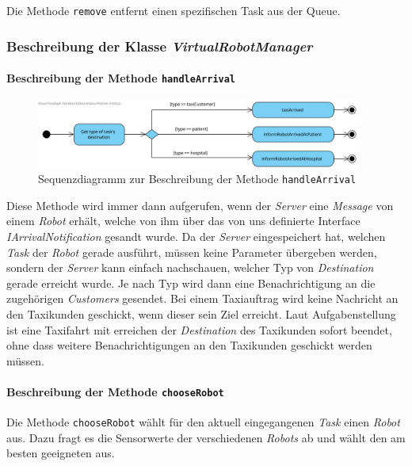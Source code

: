 			Die Methode \texttt{remove} entfernt einen spezifischen Task aus der Queue.
			
	\subsubsection{Beschreibung der Klasse \textit{VirtualRobotManager}}
			\paragraph{Beschreibung der Methode \texttt{handleArrival}}
			\begin{figure}[H]
			\centering
			\includegraphics[width=0.95\textwidth]{img/HandleArrival}
			\caption{Sequenzdiagramm zur Beschreibung der Methode \texttt{handleArrival}}
			\label{SequenzQueuePoll}
			\end{figure}	
			Diese Methode wird immer dann aufgerufen, wenn der \textit{Server} eine \textit{Message} von einem \textit{Robot} erhält, welche von ihm über das von uns definierte Interface \textit{IArrivalNotification} gesandt wurde. Da der \textit{Server} eingespeichert hat, welchen \textit{Task} der \textit{Robot} gerade ausführt, müssen keine Parameter übergeben werden, sondern der \textit{Server} kann einfach nachschauen, welcher Typ von \textit{Destination} gerade erreicht wurde. Je nach Typ wird dann eine Benachrichtigung an die zugehörigen \textit{Customers} gesendet. Bei einem Taxiauftrag wird keine Nachricht an den Taxikunden geschickt, wenn dieser sein Ziel erreicht. Laut Aufgabenstellung ist eine Taxifahrt mit erreichen der \textit{Destination} des Taxikunden sofort beendet, ohne dass weitere Benachrichtigungen an den Taxikunden geschickt werden müssen.
			
			
			\paragraph{Beschreibung der Methode \texttt{chooseRobot}}
			Die Methode \texttt{chooseRobot} wählt für den aktuell eingegangenen \emph{Task} einen \emph{Robot} aus. 
			Dazu fragt es die Sensorwerte der verschiedenen \emph{Robots} ab und wählt den am besten geeigneten aus.
				
